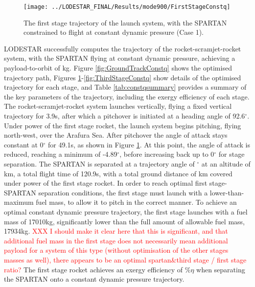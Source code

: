 \begin{figure}[ht!]
	\centering
	\texttt{[image: ../LODESTAR\_FINAL/Results/mode900/FirstStageConstq]}
	\caption{The first stage trajectory of the launch system, with the SPARTAN constrained to flight at constant dynamic pressure (Case 1).}
	\label{fig:FirstStageConstq}
\end{figure}
LODESTAR successfully computes the trajectory of the rocket-scramjet-rocket system, with the SPARTAN flying at constant dynamic pressure, achieving a payload-to-orbit of \PayloadToOrbitConstqNoReturn kg.
Figure \ref{fig:GroundTrackConstq} shows the optimised trajectory path, Figures \ref{fig:FirstStageConstq}-\ref{fig:ThirdStageConstq} show details of the optimised trajectory for each stage, and Table \ref{tab:constqsummary} provides a summary of the key parameters of the trajectory, including the exergy efficiency of each stage.
The rocket-scramjet-rocket system launches vertically, flying a fixed vertical trajectory for 3.9s, after which a pitchover is initiated at a heading angle of 92.6$^\circ$. Under power of the first stage rocket, the launch system begins pitching, flying north-west, over the Arafura Sea. 
After pitchover the angle of attack stays constant at 0$^\circ$ for 49.1s, as shown in Figure \ref{fig:FirstStageConstq}. At this point, the angle of attack is reduced, reaching a minimum of -4.89$^\circ$, before increasing back up to 0$^\circ$ for stage separation. 
The SPARTAN is separated at a trajectory angle of \firstsecondSeparationgammaConstqNoReturn$^\circ$ at an altitude of \firstsecondSeparationAltConstqNoReturn km, a total flight time of 120.9s, with a total ground distance of \FirstStageDistStandardNoReturn km covered under power of the first stage rocket. 
 In order to reach optimal first stage-SPARTAN separation conditions, the first stage must launch with a lower-than-maximum fuel mass, to allow it to pitch in the correct manner. To achieve an optimal constant dynamic pressure trajectory, the first stage launches with a fuel mass of 17010kg, significantly lower than the full amount of allowable fuel mass, 17934kg. 
 \textcolor{red}{XXX I should make it clear here that this is significant, and that additional fuel mass in the first stage does not necessarily mean additional payload for a system of this type (without optimisation of the other stages masses as well), there appears to be an optimal spartan\&third stage / first stage ratio?}
The first stage rocket achieves an exergy efficiency of \firstExergyEffConstqNoReturn\%$\eta$ when separating the SPARTAN onto a constant dynamic pressure trajectory. 


